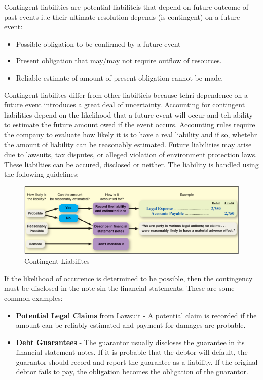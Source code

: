 \documentclass[../main.tex]{subfiles}
\begin{document}
	Contingent liabilities are potential liabiliteis that depend on future 
	outcome of past events i..e their ultimate resolution depends (is 
	contingent) on a future event:
	\begin{itemize}[noitemsep]
		\item Possible obligation to be confirmed by a future event
		\item Present obligation that may/may not require outflow of resources.
		\item Reliable estimate of amount of present obligation cannot be made. 
	\end{itemize}
	Contingent liabilites differ from other liabiltieis because tehri 
	dependence on a future event introduces a great deal of uncertainty. 
	Accounting for contingent liabilities depend on the likelihood that a 
	future event will occur and teh ability to estimate the future amount owed 
	if the event occurs. Accounting rules require the company to evaluate how 
	likely it is to have a real liability and if so, whetehr the amount of 
	liability can be reasonably estimated. 
	Future liabilities may arise due to lawsuits, tax disputes, or alleged 
	violation of environment protection laws. These liabilties can be accured, 
	disclosed or neither. The liability is handled using the following 
	guidelines: 
	\begin{figure}[ht]
		\centering
		\includegraphics[width=1\columnwidth]{images/c10_contingent_liabilities.png}
		\caption{Contingent Liabilites}
	\end{figure}
	
	If the likelihood of occurence is determined to be possible, then the 
	contingency must be disclosed in the note sin the financial statements. 
	These are some common examples: 
	\begin{itemize}[noitemsep]
		\item \textbf{Potential Legal Claims} from Lawsuit - A potential claim 
		is recorded if the amount can be reliably estimated and payment for 
		damages are probable.
		\item \textbf{Debt Guarantees} - The guarantor usually discloses the 
		guarantee in its financial statement notes. If it is probable that the 
		debtor will default, the guarantor should record and report the 
		guarantee as a liability. If the original debtor fails to pay, the 
		obligation becomes the obligation of the guarantor. 
	\end{itemize}
	
\end{document}
